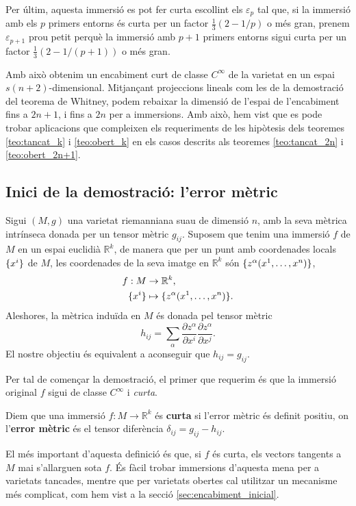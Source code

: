 Per últim, aquesta immersió es pot fer curta escollint els $\varepsilon_p$ tal que, si la immersió amb els $p$ primers entorns és curta per un factor $\frac13(2-1/p)$ o més gran, prenem $\varepsilon_{p+1}$ prou petit perquè la immersió amb $p+1$ primers entorns sigui curta per un factor $\frac13(2-1/(p+1))$ o més gran. 

Amb això obtenim un encabiment curt de classe $C^\infty$ de la varietat en un espai $s(n+2)$-dimensional. Mitjançant projeccions lineals com les de la demostració del teorema de Whitney, podem rebaixar la dimensió de l'espai de l'encabiment fins a $2n+1$, i fins a $2n$ per a immersions. Amb això, hem vist que es pode trobar aplicacions que compleixen els requeriments de les hipòtesis dels teoremes \ref{teo:tancat_k} i \ref{teo:obert_k} en els casos descrits als teoremes \ref{teo:tancat_2n} i \ref{teo:obert_2n+1}.


\subsection{Inici de la demostració: l'error mètric}

Sigui $(M,g)$ una varietat riemanniana suau de dimensió $n$, amb la seva mètrica intrínseca donada per un tensor mètric $g_{ij}$. Suposem que tenim una immersió $f$ de $M$ en un espai euclidià $\mathbb R^k$, de manera que per un punt amb coordenades locals $\{x^i\}$ de $M$, les coordenades de la seva imatge en $\mathbb R^k$ són $\{z^\alpha(x^1, \dots, x^n)\}$,
\begin{align*}
    f:M&\to \mathbb R^k, \\
    \{x^i\} &\mapsto \{z^\alpha(x^1, \dots, x^n)\}. 
\end{align*}
Aleshores, la mètrica induïda en $M$ és donada pel tensor mètric
\begin{equation*}
    h_{ij} = \sum_\alpha \frac{\partial z^\alpha}{\partial x^i}\frac{\partial z^\alpha}{\partial x^j}.
\end{equation*}
El nostre objectiu és equivalent a aconseguir que $h_{ij}=g_{ij}.$

Per tal de començar la demostració, el primer que requerim és que la immersió original $f$ sigui de classe $C^\infty$ i \textit{curta}.
\begin{defi}\label{def:curta}
    Diem que una immersió $f:M\to \mathbb R^k$ és \textbf{curta} si l'error mètric és definit positiu, on l'\textbf{error mètric} és el tensor diferència $\delta_{ij} = g_{ij} - h_{ij}$.
\end{defi}
El més important d'aquesta definició és que, si $f$ és curta, els vectors tangents a $M$ mai s'allarguen sota $f$. És fàcil trobar immersions d'aquesta mena per a varietats tancades, mentre que per varietats obertes cal utilitzar un mecanisme més complicat, com hem vist a la secció \ref{sec:encabiment_inicial}.

